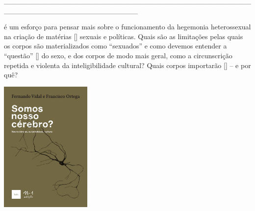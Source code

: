 \hspace*{-2cm}\_\_\_\_\_\_\_\_\_\_\_\_\_\_\_\_\_\_\_\_\_\_\_\_\_\_\_\_\_\_\_\_\_\_\_\_\_\_\_\_\_\_\_\_\_\_\_\_\_\_\_\_\_\_\_\_\_\_\_\_\_\_\_\_\_\_\_\_\_\_\_\_\_\_

\medskip

 é um esforço para pensar mais sobre o funcionamento da hegemonia heterossexual na criação de matérias [{}] sexuais e políticas. Quais são as limitações pelas quais os corpos são materializados como “sexuados” e como devemos entender a “questão” [{}] do sexo, e dos corpos de modo mais geral, como a circunscrição repetida e violenta da inteligibilidade cultural? Quais corpos importarão [{}] – e por quê?

\vfill

\hspace*{-.4cm}\begin{minipage}[c]{1\linewidth}
\small{
{}}
\end{minipage}

\pagebreak

\hspace{.5cm}

\begin{center}
\hspace*{-2.5cm}
\hspace*{2cm}\includegraphics[width=45mm]{./imgs/cerebro.jpeg}
\end{center}

